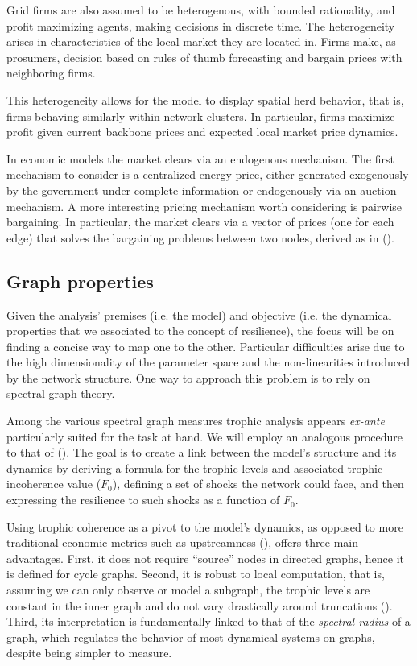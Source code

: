 \documentclass[american]{scrartcl}
\begin{document}
Grid firms are also assumed to be heterogenous, with bounded rationality, and profit maximizing agents, making decisions in discrete time. The heterogeneity arises in characteristics of the local market they are located in. Firms make, as prosumers, decision based on rules of thumb forecasting and bargain prices with neighboring firms.

This heterogeneity allows for the model to display spatial herd behavior, that is, firms behaving similarly within network clusters. In particular, firms maximize profit given current backbone prices and expected local market price dynamics.

In economic models the market clears via an endogenous mechanism. The first mechanism to consider is a centralized energy price, either generated exogenously by the government under complete information or endogenously via an auction mechanism. A more interesting pricing mechanism worth considering is pairwise bargaining. In particular, the market clears via a vector of prices (one for each edge) that solves the bargaining problems between two nodes, derived as in \citeauthor{Bedayo2016} (\citeyear{Bedayo2016}).

\subsection{Graph properties}

Given the analysis' premises (i.e. the model) and objective (i.e. the dynamical properties that we associated to the concept of resilience), the focus will be on finding a concise way to map one to the other. Particular difficulties arise due to the high dimensionality of the parameter space and the non-linearities introduced by the network structure. One way to approach this problem is to rely on spectral graph theory.

Among the various spectral graph measures trophic analysis appears \textit{ex-ante} particularly suited for the task at hand. We will employ an analogous procedure to that of \citeauthor{MacKay2020} (\citeyear[p.~19]{MacKay2020}). The goal is to create a link between the model's structure and its dynamics by deriving a formula for the trophic levels and associated trophic incoherence value ($F_0$), defining a set of shocks the network could face, and then expressing the resilience to such shocks as a function of $F_0$.

Using trophic coherence as a pivot to the model's dynamics, as opposed to more traditional economic metrics such as upstreamness (\cite{Antrs2012}), offers three main advantages. First, it does not require ``source'' nodes in directed graphs, hence it is defined for cycle graphs. Second, it is robust to local computation, that is, assuming we can only observe or model a subgraph, the trophic levels are constant in the inner graph and do not vary drastically around truncations (\cite[p.~19]{MacKay2020}). Third, its interpretation is fundamentally linked to that of the \textit{spectral radius} of a graph, which regulates the behavior of most dynamical systems on graphs, despite being simpler to measure.
\end{document}
